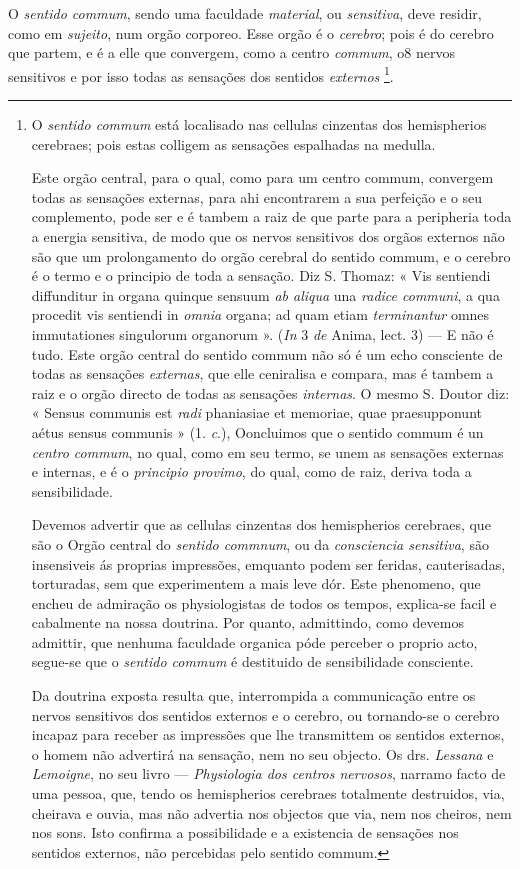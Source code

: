  
O \emph{sentido commum}, sendo uma faculdade \emph{material}, ou \emph{sensitiva}, deve residir, como em \emph{sujeito}, num orgão corporeo. Esse orgão é o \emph{cerebro}; pois é do cerebro que partem, e é a elle que convergem, como a centro \emph{commum}, o8 nervos sensitivos e por isso todas as sensações dos sentidos \emph{externos} \footnote{O \emph{sentido commum} está localisado nas cellulas cinzentas dos hemispherios cerebraes; pois estas colligem as sensações espalhadas na medulla.\par Este orgão central, para o qual, como para um centro commum, convergem todas as sensações externas, para ahi encontrarem a sua perfeição e o seu complemento, pode ser e é tambem a raiz de que parte para a peripheria toda a energia sensitiva, de modo que os nervos sensitivos dos orgãos externos não são que um prolongamento do orgão cerebral do sentido commum, e o cerebro é o termo e o principio de toda a sensação. Diz S. Thomaz: « Vis sentiendi diffunditur in organa quinque sensuum \emph{ab aliqua} una \emph{radice communi}, a qua procedit vis sentiendi in \emph{omnia} organa; ad quam etiam \emph{terminantur} omnes immutationes singulorum organorum ». (\emph{In} 3 \emph{de} Anima, lect. 3) --- E não é tudo. Este orgão central do sentido commum não só é um echo consciente de todas as sensações \emph{externas}, que elle ceniralisa e compara, mas é tambem a raiz e o orgão directo de todas as sensações \emph{internas}. O mesmo S. Doutor diz: « Sensus communis est \emph{radi} phaniasiae et memoriae, quae praesupponunt aétus sensus communis » (1. \emph{c}.), Ooncluimos que o sentido commum é un \emph{centro commum}, no qual, como em seu termo, se unem as sensações externas e internas, e é o \emph{principio provimo}, do qual, como de raiz, deriva toda a sensibilidade.\par Devemos advertir que as cellulas cinzentas dos hemispherios cerebraes, que são o Orgão central do \emph{sentido commnum}, ou da \emph{consciencia sensitiva}, são insensiveis ás proprias impressões, emquanto podem ser feridas, cauterisadas, torturadas, sem que experimentem a mais leve dór. Este phenomeno, que encheu de admiração os physiologistas de todos os tempos, explica-se facil e cabalmente na nossa doutrina. Por quanto, admittindo, como devemos admittir, que nenhuma faculdade organica póde perceber o proprio acto, segue-se que o \emph{sentido commum} é destituido de sensibilidade consciente.\par Da doutrina exposta resulta que, interrompida a communicação entre os nervos sensitivos dos sentidos externos e o cerebro, ou tornando-se o cerebro incapaz para receber as impressões que lhe transmittem os sentidos externos, o homem não advertirá na sensação, nem no seu objecto. Os drs. \emph{Lessana} e \emph{Lemoigne}, no seu livro --- \emph{Physiologia dos centros nervosos}, narramo facto de uma pessoa, que, tendo os hemispherios cerebraes totalmente destruidos, via, cheirava e ouvia, mas não advertia nos objectos que via, nem nos cheiros, nem nos sons. Isto confirma a possibilidade e a existencia de sensações nos sentidos externos, não percebidas pelo sentido commum.}.

